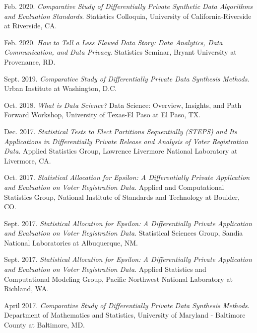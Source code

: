 \documentclass[11pt, letterpaper, roman]{moderncv} %
\begin{document}
\begin{etaremune}[topsep=0pt, itemsep=6pt, partopsep=0pt, parsep=0pt]
  \item Feb. 2020. \textit{Comparative Study of Differentially Private Synthetic Data Algorithms and Evaluation Standards}. Statistics Colloquia, University of California-Riverside at Riverside, CA.
  
  \item Feb. 2020. \textit{How to Tell a Less Flawed Data Story: Data Analytics, Data Communication, and Data Privacy}. Statistics Seminar, Bryant University at Provenance, RD.
  
  \item Sept. 2019. \textit{Comparative Study of Differentially Private Data Synthesis Methods}. Urban Institute at Washington, D.C.
  
  \item Oct. 2018. \textit{What is Data Science?} Data Science: Overview, Insights, and Path Forward Workshop, University of Texas-El Paso at El Paso, TX.

  \item Dec. 2017. \textit{Statistical Tests to Elect Partitions Sequentially (STEPS) and Its Applications in Differentially Private Release and Analysis of Voter Registration Data}. Applied Statistics Group, Lawrence Livermore National Laboratory at Livermore, CA.
  
  \item Oct. 2017. \textit{Statistical Allocation for Epsilon: A Differentially Private Application and Evaluation on Voter Registration Data}. Applied and Computational Statistics Group, National Institute of Standards and Technology at Boulder, CO.
  
  \item Sept. 2017. \textit{Statistical Allocation for Epsilon: A Differentially Private Application and Evaluation on Voter Registration Data}. Statistical Sciences Group, Sandia National Laboratories at Albuquerque, NM.
  
  \item Sept. 2017. \textit{Statistical Allocation for Epsilon: A Differentially Private Application and Evaluation on Voter Registration Data}. Applied Statistics and Computational Modeling Group, Pacific Northwest National Laboratory at Richland, WA.
  
  \item April 2017. \textit{Comparative Study of Differentially Private Data Synthesis Methods}. Department of Mathematics and Statistics, University of Maryland - Baltimore County at Baltimore, MD.
\end{etaremune}
\end{document}
